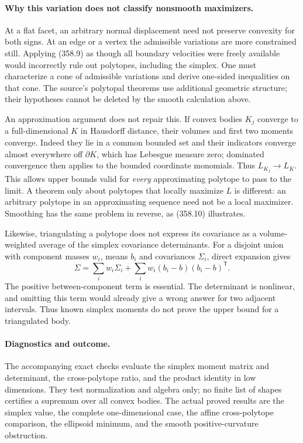 \documentclass[11pt]{article}
\begin{document}
\paragraph{Why this variation does not classify nonsmooth maximizers.}
At a flat facet, an arbitrary normal displacement need not preserve
convexity for both signs. At an edge or a vertex the admissible
variations are more constrained still. Applying (358.9) as though all
boundary velocities were freely available would incorrectly rule out
polytopes, including the simplex. One must characterize a cone of
admissible variations and derive one-sided inequalities on that cone.
The source's polytopal theorems use additional geometric structure;
their hypotheses cannot be deleted by the smooth calculation above.

An approximation argument does not repair this. If convex bodies
$K_j$ converge to a full-dimensional $K$ in Hausdorff distance, their
volumes and first two moments converge. Indeed they lie in a common
bounded set and their indicators converge almost everywhere off
$\partial K$, which has Lebesgue measure zero; dominated convergence
then applies to the bounded coordinate monomials. Thus $L_{K_j}\to L_K$.
This allows upper bounds valid for \emph{every} approximating polytope
to pass to the limit. A theorem only about polytopes that locally
maximize $L$ is different: an arbitrary polytope in an approximating
sequence need not be a local maximizer. Smoothing has the same
problem in reverse, as (358.10) illustrates.

Likewise, triangulating a polytope does not express its covariance
as a volume-weighted average of the simplex covariance determinants.
For a disjoint union with component masses $w_i$, means $b_i$ and
covariances $\Sigma_i$, direct expansion gives
\[
 \Sigma=\sum_iw_i\Sigma_i+
          \sum_iw_i(b_i-b)(b_i-b)^{\mathsf T}.
 \tag{358.11}
\]
The positive between-component term is essential. The determinant
is nonlinear, and omitting this term would already give a wrong
answer for two adjacent intervals. Thus known simplex moments do
not prove the upper bound for a triangulated body.

\paragraph{Diagnostics and outcome.}
The accompanying exact checks evaluate the simplex moment matrix
and determinant, the cross-polytope ratio, and the product identity
in low dimensions. They test normalization and algebra only; no
finite list of shapes certifies a supremum over all convex bodies.
The actual proved results are the simplex value, the complete
one-dimensional case, the affine cross-polytope comparison, the
ellipsoid minimum, and the smooth positive-curvature obstruction.
\end{document}
